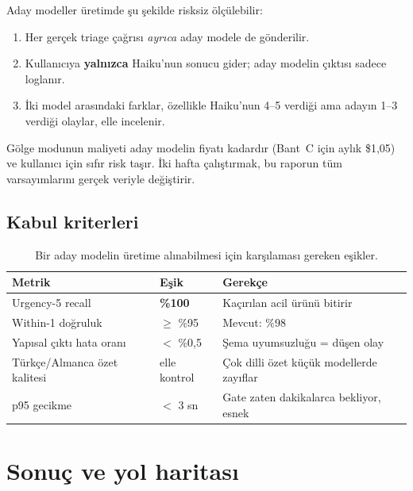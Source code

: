 \documentclass[11pt,a4paper]{article}
\begin{document}
Aday modeller üretimde şu şekilde risksiz ölçülebilir:

\begin{enumerate}[leftmargin=1.4em,itemsep=3pt]
  \item Her gerçek triage çağrısı \emph{ayrıca} aday modele de gönderilir.
  \item Kullanıcıya \textbf{yalnızca} Haiku'nun sonucu gider; aday modelin çıktısı sadece
        loglanır.
  \item İki model arasındaki farklar, özellikle Haiku'nun 4--5 verdiği ama adayın 1--3
        verdiği olaylar, elle incelenir.
\end{enumerate}

Gölge modunun maliyeti aday modelin fiyatı kadardır (Bant~C için aylık \$1{,}05) ve
kullanıcı için sıfır risk taşır. İki hafta çalıştırmak, bu raporun tüm varsayımlarını
gerçek veriyle değiştirir.

\subsection{Kabul kriterleri}

\begin{table}[h]
\centering\small
\begin{tabular}{@{}lll@{}}
\toprule
\textbf{Metrik} & \textbf{Eşik} & \textbf{Gerekçe} \\
\midrule
Urgency-5 recall & \textbf{\%100} & Kaçırılan acil ürünü bitirir \\
Within-1 doğruluk & $\geq$ \%95 & Mevcut: \%98 \\
Yapısal çıktı hata oranı & $<$ \%0{,}5 & Şema uyumsuzluğu = düşen olay \\
Türkçe/Almanca özet kalitesi & elle kontrol & Çok dilli özet küçük modellerde zayıflar \\
p95 gecikme & $<$ 3 sn & Gate zaten dakikalarca bekliyor, esnek \\
\bottomrule
\end{tabular}
\caption{Bir aday modelin üretime alınabilmesi için karşılaması gereken eşikler.}
\end{table}

\section{Sonuç ve yol haritası}
\end{document}
